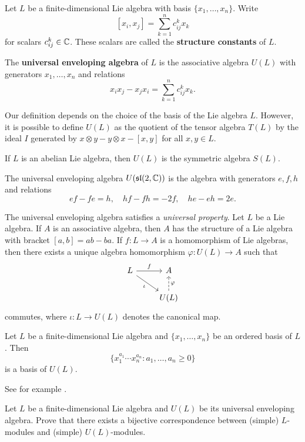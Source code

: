 
Let $L$ be a finite-dimensional Lie algebra with
basis $\{x_1,\dots,x_n\}$. Write
\[
[x_i,x_j]=\sum_{k=1}^n c^k_{ij}x_k
\]
for scalars $c_{ij}^k\in\mathbb{C}$. 
These scalars are called 
the \textbf{structure constants} of $L$. 

The \textbf{universal enveloping algebra} of $L$ 
is the associative algebra $U(L)$ with generators 
$x_1,\dots,x_n$ and relations 
\[
x_ix_j-x_jx_i=\sum_{k=1}^n c_{ij}^kx_k.
\]

Our definition depends on the choice of the basis of the Lie algebra $L$. 
However, it is possible to define $U(L)$ as the quotient 
of the tensor algebra $T(L)$ by the ideal $I$ 
generated by $x\otimes y-y\otimes x-[x,y]$ for all $x,y\in L$.  

\begin{example}
    If $L$ is an abelian Lie algebra, then $U(L)$ is 
    the symmetric algebra $S(L)$. 
\end{example}

\begin{example}
    The universal enveloping algebra $U(\mathfrak{sl}(2,\mathbb{C}))$ 
    is the algebra with generators $e,f,h$ and relations 
    \[
    ef-fe=h,\quad
    hf-fh=-2f,\quad
    he-eh=2e.
    \]
\end{example}


The universal enveloping algebra satisfies a \emph{universal property}. 
Let $L$ be a Lie algebra. If $A$ is an associative algebra, then
$A$ has the structure of a Lie algebra with
bracket 
$[a,b]=ab-ba$. If $f\colon L\to A$ is a homomorphism of Lie algebras, 
then there exists a unique algebra homomorphism
$\varphi\colon U(L)\to A$ such that 
\[
\begin{tikzcd}
	L & A \\
	& U(L)
	\arrow["f", from=1-1, to=1-2]
	\arrow["{\iota }"', from=1-1, to=2-2]
	\arrow["\varphi"', dashed, from=2-2, to=1-2]
\end{tikzcd}
\]
commutes, where $\iota\colon L\to U(L)$ 
denotes the canonical map. 


\begin{theorem}
    \label{thm:PBW}
    Let $L$ be a finite-dimensional Lie algebra and 
    $\{x_1,\dots,x_n\}$ be an ordered basis of $L$. Then 
    \[
    \{x_1^{a_1}\cdots x_n^{a_n}:a_1,\dots,a_n\geq0\}
    \]
    is a basis of $U(L)$. 
\end{theorem}

See for example \cite[\S17.4]{MR499562}. 

\begin{exercise}
    Let $L$ be a finite-dimensional Lie algebra and $U(L)$ be its
    universal enveloping algebra. Prove that there exists a bijective
    correspondence between (simple) $L$-modules and (simple) $U(L)$-modules. 
\end{exercise}

